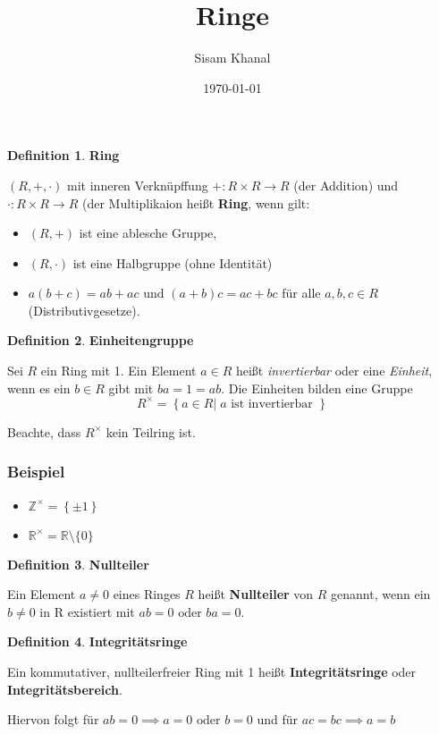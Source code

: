 \documentclass[12pt]{article}
\title{Ringe}
\author{Sisam Khanal}
\date{\today}
\begin{document}
\maketitle

\newtheorem{theorem}{Theorem}
\theoremstyle{definition}
\newtheorem{definition}{Definition}
\newcommand{\iu}{{i\mkern1mu}}
\newcommand{\defn}[2]{
	\begin{definition} \textbf{ #1}
  #2
  \end{definition}
}


\defn{Ring}{
	$ \left( R, +, \cdot \right)  $ mit inneren Verknüpffung $ + : R \times R \to R  $ (der Addition) und 
	$ \cdot : R \times R \to R $ (der Multiplikaion heißt \textbf{Ring}, wenn gilt:
	\begin{itemize}
		\item $ (R, +)  $ ist eine ablesche Gruppe,
		\item $ (R,\cdot) $ ist eine Halbgruppe (ohne Identität)
		\item $ a(b+c) = ab +ac \text{ und } (a+b)c = ac+bc $ für alle $ a,b,c \in R $ (Distributivgesetze).
	\end{itemize}
}
\defn{Einheitengruppe}{
	Sei $ R $ ein Ring mit 1. Ein Element $ a \in R $ heißt \textit{invertierbar} oder eine \textit{Einheit},
	wenn es ein $ b \in R $ gibt mit $ ba = 1 = ab $. Die Einheiten bilden eine Gruppe 
	$$ R^{\times} = \left\{ a \in R | \;  a \text{ ist invertierbar  } \right\}  $$
}
Beachte, dass $ R^{\times} $ kein Teilring ist.
\subsubsection*{Beispiel}
\begin{itemize}
	\item $ \mathbb{Z}^{\times} = \left\{ \pm 1 \right\}  $
	\item $ \mathbb{R}^{\times} = \mathbb{R} \setminus \{0\} $ 
\end{itemize}
\defn{Nullteiler}{
	Ein Element $ a \neq 0 $ eines Ringes $ R $ heißt \textbf{Nullteiler} von $ R $ genannt, wenn ein 
	$ b \neq 0 $ in R existiert mit $ a b = 0 \text{ oder } b a=0	$. 
}
\defn{Integritätsringe}{
	Ein kommutativer, nullteilerfreier Ring mit 1 heißt \textbf{Integritätsringe} oder \textbf{Integritätsbereich}.
}
	Hiervon folgt für $ a b=0 \implies a = 0 \text{ oder } b = 0$ und für $ ac = bc \implies a = b $ 
\end{document}
